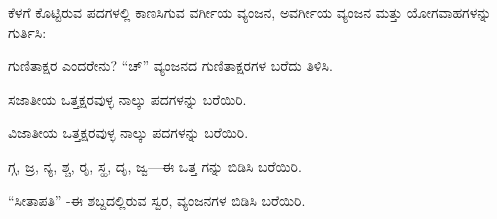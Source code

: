 \vspace{2.5pt plus 3pt minus 0.5pt}\noindent\hspace*{1.2em}\hspace{0.55em}ಕೆಳಗೆ ಕೊಟ್ಟಿರುವ ಪದಗಳಲ್ಲಿ ಕಾಣಸಿಗುವ ವರ್ಗೀಯ ವ್ಯಂಜನ, ಅವರ್ಗೀಯ ವ್ಯಂಜನ ಮತ್ತು ಯೋಗವಾಹಗಳನ್ನು ಗುರ್ತಿಸಿ:

\vspace{5pt plus 4pt minus 1pt}
\vspace{5pt plus 4pt minus 1pt}

\vspace{2.5pt plus 3pt minus 0.5pt}\noindent\hspace*{1.2em}\hspace{0.55em}ಗುಣಿತಾಕ್ಷರ ಎಂದರೇನು? “ಚ್” ವ್ಯಂಜನದ ಗುಣಿತಾಕ್ಷರಗಳ ಬರೆದು ತಿಳಿಸಿ.\par

\vspace{2.5pt plus 3pt minus 0.5pt}\noindent\hspace*{1.2em}\hspace{0.55em}ಸಜಾತೀಯ ಒತ್ತಕ್ಷರವುಳ್ಳ ನಾಲ್ಕು ಪದಗಳನ್ನು ಬರೆಯಿರಿ.\par

\vspace{2.5pt plus 3pt minus 0.5pt}\noindent\hspace*{1.2em}\hspace{0.55em}ವಿಜಾತೀಯ ಒತ್ತಕ್ಷರವುಳ್ಳ ನಾಲ್ಕು ಪದಗಳನ್ನು ಬರೆಯಿರಿ.\par

\vspace{2.5pt plus 3pt minus 0.5pt}\noindent\hspace*{1.2em}\hspace{0.55em}ಗ್ಗ, ಜ್ರ, ನ್ಯ, ಶ್ಚ, ರೃ, ಸ್ಹ, ದೃ, ಜ್ವ—ಈ ಒತ್ತ ಗನ್ನು ಬಿಡಿಸಿ ಬರೆಯಿರಿ.\par

\vspace{2.5pt plus 3pt minus 0.5pt}\noindent\hspace*{1.2em}\hspace{0.55em}“ಸೀತಾಪತಿ” -ಈ ಶಬ್ದದಲ್ಲಿರುವ ಸ್ವರ, ವ್ಯಂಜನಗಳ ಬಿಡಿಸಿ ಬರೆಯಿರಿ.\par

